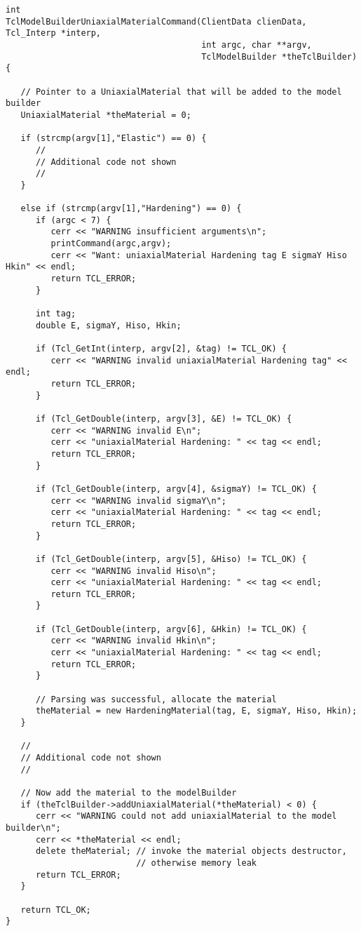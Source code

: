 \documentclass[12pt]{article}
\begin{document}
{\sf\small
\begin{verbatim}
int
TclModelBuilderUniaxialMaterialCommand(ClientData clienData, Tcl_Interp *interp,
                                       int argc, char **argv,
                                       TclModelBuilder *theTclBuilder)
{

   // Pointer to a UniaxialMaterial that will be added to the model builder
   UniaxialMaterial *theMaterial = 0;

   if (strcmp(argv[1],"Elastic") == 0) {
      //
      // Additional code not shown
      //
   }

   else if (strcmp(argv[1],"Hardening") == 0) {
      if (argc < 7) {
         cerr << "WARNING insufficient arguments\n";
         printCommand(argc,argv);
         cerr << "Want: uniaxialMaterial Hardening tag E sigmaY Hiso Hkin" << endl;
         return TCL_ERROR;
      }

      int tag;
      double E, sigmaY, Hiso, Hkin;

      if (Tcl_GetInt(interp, argv[2], &tag) != TCL_OK) {
         cerr << "WARNING invalid uniaxialMaterial Hardening tag" << endl;
         return TCL_ERROR;		
      }

      if (Tcl_GetDouble(interp, argv[3], &E) != TCL_OK) {
         cerr << "WARNING invalid E\n";
         cerr << "uniaxialMaterial Hardening: " << tag << endl;
         return TCL_ERROR;	
      }

      if (Tcl_GetDouble(interp, argv[4], &sigmaY) != TCL_OK) {
         cerr << "WARNING invalid sigmaY\n";
         cerr << "uniaxialMaterial Hardening: " << tag << endl;
         return TCL_ERROR;
      }

      if (Tcl_GetDouble(interp, argv[5], &Hiso) != TCL_OK) {
         cerr << "WARNING invalid Hiso\n";
         cerr << "uniaxialMaterial Hardening: " << tag << endl;
         return TCL_ERROR;	
      }

      if (Tcl_GetDouble(interp, argv[6], &Hkin) != TCL_OK) {
         cerr << "WARNING invalid Hkin\n";
         cerr << "uniaxialMaterial Hardening: " << tag << endl;
         return TCL_ERROR;	
      }

      // Parsing was successful, allocate the material
      theMaterial = new HardeningMaterial(tag, E, sigmaY, Hiso, Hkin);       
   }

   //
   // Additional code not shown
   //

   // Now add the material to the modelBuilder
   if (theTclBuilder->addUniaxialMaterial(*theMaterial) < 0) {
      cerr << "WARNING could not add uniaxialMaterial to the model builder\n";
      cerr << *theMaterial << endl;
      delete theMaterial; // invoke the material objects destructor,
                          // otherwise memory leak
      return TCL_ERROR;
   }

   return TCL_OK;
}
\end{verbatim}
}
\end{document}
